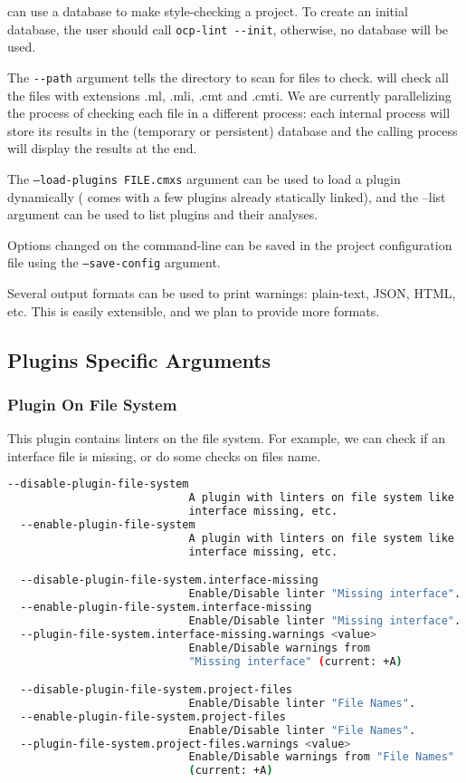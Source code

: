 \ocplint{} can use a database to make style-checking a project. To create an
initial database, the user should call {\tt ocp-lint \--\--init}, otherwise, no
database will be used.

The {\tt \--\--path} argument tells \ocplint{} the directory to scan for
files to check. \ocplint{} will check all the files with extensions
{\sf .ml}, {\sf .mli}, {\sf .cmt} and {\sf .cmti}. We are currently
parallelizing the process of checking each file in a different
process: each internal process will store its results in the
(temporary or persistent) database and the calling process will
display the results at the end.

The {\tt --load-plugins FILE.cmxs} argument can be used to load a
plugin dynamically (\ocplint{} comes with a few plugins already
statically linked), and the {\sf --list} argument can be used to list
plugins and their analyses.

Options changed on the command-line can be saved in the project
configuration file using the {\tt --save-config} argument.

Several output formats can be used to print warnings: plain-text, JSON,
HTML, etc. This is easily extensible, and we plan to provide more formats.

\subsection{Plugins Specific Arguments}
\subsubsection*{Plugin On File System}
This plugin contains linters on the file system. For example, we can check if an
interface file is missing, or do some checks on files name.

\begin{lstlisting}[language=bash,basicstyle=\tt\small,showspaces=false,showstringspaces=false]
  --disable-plugin-file-system  
                            A plugin with linters on file system like 
                            interface missing, etc.
  --enable-plugin-file-system  
                            A plugin with linters on file system like 
                            interface missing, etc.

  --disable-plugin-file-system.interface-missing  
                            Enable/Disable linter "Missing interface".
  --enable-plugin-file-system.interface-missing  
                            Enable/Disable linter "Missing interface".
  --plugin-file-system.interface-missing.warnings <value> 
                            Enable/Disable warnings from 
                            "Missing interface" (current: +A)

  --disable-plugin-file-system.project-files  
                            Enable/Disable linter "File Names".
  --enable-plugin-file-system.project-files  
                            Enable/Disable linter "File Names".
  --plugin-file-system.project-files.warnings <value> 
                            Enable/Disable warnings from "File Names" 
                            (current: +A)
\end{lstlisting}

